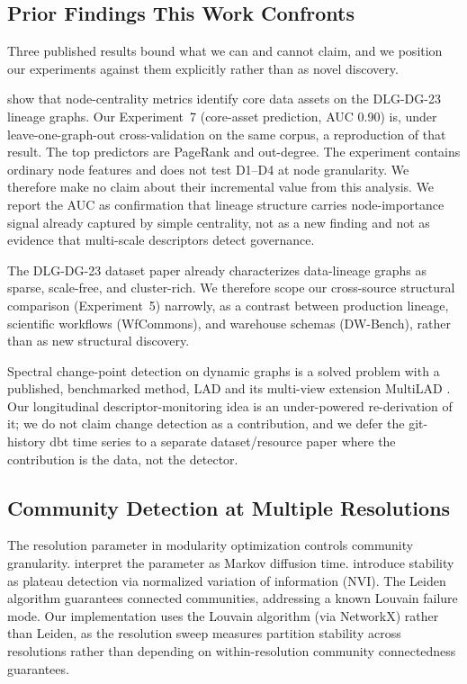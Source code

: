 \documentclass[11pt,a4paper]{article}
\begin{document}
\subsection{Prior Findings This Work Confronts}

Three published results bound what we can and cannot claim, and we
position our experiments against them explicitly rather than as novel
discovery.

\citet{chen2023centrality} show that node-centrality metrics identify
core data assets on the DLG-DG-23 lineage graphs. Our Experiment~7
(core-asset prediction, AUC 0.90) is, under leave-one-graph-out
cross-validation on the same corpus, a reproduction of that result.
The top predictors are PageRank and out-degree. The experiment contains
ordinary node features and does not test D1--D4 at node granularity. We
therefore make no claim about their incremental value from this analysis.
We report the AUC as confirmation that lineage structure carries
node-importance signal already captured by simple centrality, not as a
new finding and not as evidence that multi-scale descriptors detect
governance.

The DLG-DG-23 dataset paper \citep{chen2024dlgdg} already characterizes
data-lineage graphs as sparse, scale-free, and cluster-rich. We
therefore scope our cross-source structural comparison (Experiment~5)
narrowly, as a contrast between production lineage, scientific workflows
(WfCommons), and warehouse schemas (DW-Bench), rather than as new
structural discovery.

Spectral change-point detection on dynamic graphs is a solved problem
with a published, benchmarked method, LAD \citep{huang2020laplacian} and
its multi-view extension MultiLAD \citep{huang2024multilad}. Our
longitudinal descriptor-monitoring idea is an under-powered
re-derivation of it; we do not claim change detection as a contribution,
and we defer the git-history dbt time series to a separate
dataset/resource paper where the contribution is the data, not the
detector.

\subsection{Community Detection at Multiple Resolutions}

The resolution parameter in modularity optimization
\citep{reichardt2006} controls community granularity.
\citet{lambiotte2014} interpret the parameter as Markov diffusion time.
\citet{delvenne2010} introduce stability as plateau detection via
normalized variation of information (NVI). The Leiden algorithm
\citep{traag2019} guarantees connected communities, addressing a known
Louvain failure mode. Our implementation uses the Louvain algorithm
(via NetworkX) rather than Leiden, as the resolution sweep measures
partition stability across resolutions rather than depending on
within-resolution community connectedness guarantees.
\end{document}
